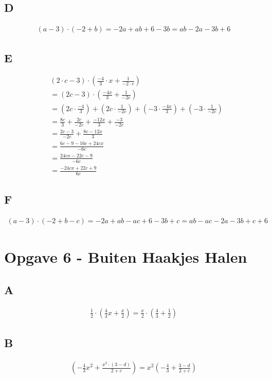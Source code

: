 \documentclass[fleqn]{article}
\begin{document}
\subsection{D}
\begin{align*}
    (a-3)\cdot(-2+b) = -2a + ab + 6 - 3b = ab -2a - 3b + 6 
\end{align*}

\subsection{E}
\begin{align*}
    &(2\cdot c - 3) \cdot ( \frac{-4}{3}\cdot x + \frac{1}{-2 \cdot c}) \\ 
    &=(2c - 3) \cdot (\frac{-4x}{3} + \frac{1}{-2c}) \\
    &= (2c \cdot \frac{-4}{3}) + (2c \cdot \frac{1}{-2c}) + (-3 \cdot \frac{-4x}{3}) + (-3 \cdot \frac{1}{-2c}) \\
    &=\frac{8c}{3} + \frac{2c}{-2c} + \frac{-12x}{3} + \frac{-3}{-2c} \\
    &=\frac{2c-3}{-2c} + \frac{8c-12x}{3} \\ 
    &=\frac{6c-9-16c+24cx}{-6c}\\
    &=\frac{24cx - 22c - 9}{-6c} \\ 
    &=\frac{-24cx + 22c + 9}{6c}
\end{align*}

\subsection{F}
\begin{align*}
    (a-3)\cdot(-2 + b -c) = -2a + ab -ac + 6 -3b + c = ab - ac - 2a -3b +c + 6
\end{align*}

\clearpage
\section{Opgave 6 - Buiten Haakjes Halen}
\subsection{A}
\begin{align*}
    \frac{1}{2} \cdot (\frac{4}{3}x + \frac{x}{2}) = \frac{x}{2} \cdot ( \frac{4}{3} + \frac{1}{2} )
\end{align*}

\subsection{B}
\begin{align*}
    (-\frac{4}{3}x^2 + \frac{x^2  \cdot (3 - d)}{2 + c}) = x^2(-\frac{4}{3} + \frac{3-d}{2+c})
\end{align*}
\end{document}
